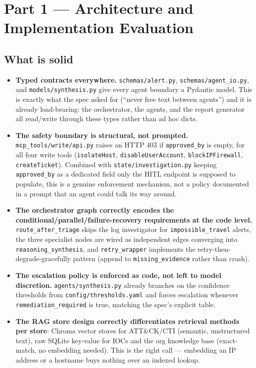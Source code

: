 \documentclass[11pt]{article}
\begin{document}
\section{Part 1 --- Architecture and Implementation Evaluation}
\label{sec:eval}

\subsection{What is solid}

\begin{itemize}
  \item \textbf{Typed contracts everywhere.} \texttt{schemas/alert.py}, \texttt{schemas/agent\_io.py}, and \texttt{models/synthesis.py} give every agent boundary a Pydantic model. This is exactly what the spec asked for (``never free text between agents'') and it is already load-bearing: the orchestrator, the agents, and the report generator all read/write through these types rather than ad hoc dicts.
  \item \textbf{The safety boundary is structural, not prompted.} \texttt{mcp\_tools/write/api.py} raises an HTTP 403 if \texttt{approved\_by} is empty, for all four write tools (\texttt{isolateHost}, \texttt{disableUserAccount}, \texttt{blockIPFirewall}, \texttt{createTicket}). Combined with \texttt{state/investigation.py} keeping \texttt{approved\_by} as a dedicated field only the HITL endpoint is supposed to populate, this is a genuine enforcement mechanism, not a policy documented in a prompt that an agent could talk its way around.
  \item \textbf{The orchestrator graph correctly encodes the conditional/parallel/failure-recovery requirements at the code level.} \texttt{route\_after\_triage} skips the log investigator for \texttt{impossible\_travel} alerts, the three specialist nodes are wired as independent edges converging into \texttt{reasoning\_synthesis}, and \texttt{retry\_wrapper} implements the retry-then-degrade-gracefully pattern (append to \texttt{missing\_evidence} rather than crash).
  \item \textbf{The escalation policy is enforced as code, not left to model discretion.} \texttt{agents/synthesis.py} already branches on the confidence thresholds from \texttt{config/thresholds.yaml} and forces escalation whenever \texttt{remediation\_required} is true, matching the spec's explicit table.
  \item \textbf{The RAG store design correctly differentiates retrieval methods per store}: Chroma vector stores for ATT\&CK/CTI (semantic, unstructured text), raw SQLite key-value for IOCs and the org knowledge base (exact-match, no embedding needed). This is the right call --- embedding an IP address or a hostname buys nothing over an indexed lookup.
\end{itemize}
\end{document}
